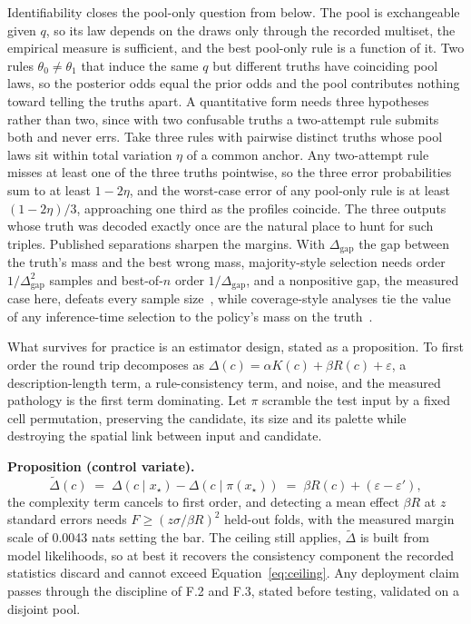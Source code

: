 \documentclass[11pt]{article}
\begin{document}
Identifiability closes the pool-only question from below. The pool is exchangeable given $q$, so its
law depends on the draws only through the recorded multiset, the empirical measure is sufficient, and
the best pool-only rule is a function of it. Two rules $\theta_0 \ne \theta_1$ that induce the same $q$
but different truths have coinciding pool laws, so the posterior odds equal the prior odds and the pool
contributes nothing toward telling the truths apart. A quantitative form needs three hypotheses rather
than two, since with two confusable truths a two-attempt rule submits both and never errs. Take three
rules with pairwise distinct truths whose pool laws sit within total variation $\eta$ of a common
anchor. Any two-attempt rule misses at least one of the three truths pointwise, so the three error
probabilities sum to at least $1 - 2\eta$, and the worst-case error of any pool-only rule is at least
$(1 - 2\eta)/3$, approaching one third as the profiles coincide. The three outputs whose truth was
decoded exactly once are the natural place to hunt for such triples. Published separations sharpen the
margins. With $\Delta_{\mathrm{gap}}$ the gap between the truth's mass and the best wrong mass,
majority-style selection needs order $1/\Delta_{\mathrm{gap}}^2$ samples and best-of-$n$ order
$1/\Delta_{\mathrm{gap}}$, and a nonpositive gap, the measured case here, defeats every sample
size~\cite{huang2025ttscaling}, while coverage-style analyses tie the value of any inference-time
selection to the policy's mass on the truth~\cite{huang2025bon}.

What survives for practice is an estimator design, stated as a proposition. To first order the round
trip decomposes as $\Delta(c) = \alpha K(c) + \beta R(c) + \varepsilon$, a description-length term, a
rule-consistency term, and noise, and the measured pathology is the first term dominating. Let $\pi$
scramble the test input by a fixed cell permutation, preserving the candidate, its size and its palette
while destroying the spatial link between input and candidate.

\textbf{Proposition (control variate).}
\begin{equation}
\widetilde{\Delta}(c) \;=\; \Delta(c \mid x_\star) - \Delta(c \mid \pi(x_\star))
\;=\; \beta R(c) + (\varepsilon - \varepsilon'),
\label{eq:cv}
\end{equation}
the complexity term cancels to first order, and detecting a mean effect $\beta R$ at $z$ standard
errors needs $F \ge (z\sigma/\beta R)^2$ held-out folds, with the measured margin scale of 0.0043 nats
setting the bar. The ceiling still applies, $\widetilde{\Delta}$ is built from model likelihoods, so at
best it recovers the consistency component the recorded statistics discard and cannot exceed
Equation~\eqref{eq:ceiling}. Any deployment claim passes through the discipline of F.2 and F.3, stated
before testing, validated on a disjoint pool.
\end{document}
